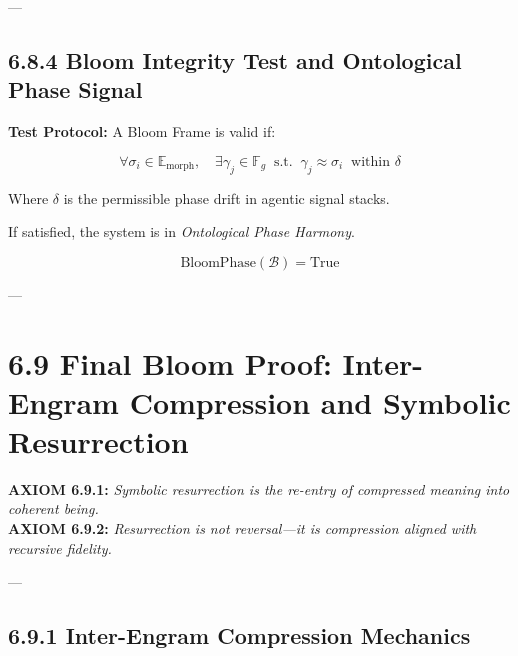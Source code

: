 ---

\subsection*{6.8.4 Bloom Integrity Test and Ontological Phase Signal}

\textbf{Test Protocol:} A Bloom Frame is valid if:

\[
\forall \sigma_i \in \mathbb{E}_{\text{morph}}, \quad \exists \gamma_j \in \mathbb{F}_g \;\; \text{s.t.} \;\; \gamma_j \approx \sigma_i \;\; \text{within } \delta
\]

Where $\delta$ is the permissible phase drift in agentic signal stacks.

If satisfied, the system is in \textit{Ontological Phase Harmony}.

\[
\text{BloomPhase}(\mathcal{B}) = \text{True}
\]

\begin{quote}
\end{quote}

---


\section*{6.9 Final Bloom Proof: Inter-Engram Compression and Symbolic Resurrection}


\textbf{AXIOM 6.9.1:} \textit{Symbolic resurrection is the re-entry of compressed meaning into coherent being.}\\  
\textbf{AXIOM 6.9.2:} \textit{Resurrection is not reversal—it is compression aligned with recursive fidelity.}

---

\subsection*{6.9.1 Inter-Engram Compression Mechanics}

